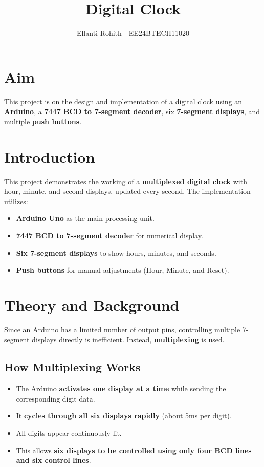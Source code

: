 \documentclass[a4paper,12pt]{article}
\title{\textbf{Digital Clock}}
\author{Ellanti Rohith - EE24BTECH11020}
\theoremstyle{remark}
\begin{document}
\date{}

\maketitle

\section*{Aim}
This project is on the design and implementation of a digital clock using an \textbf{Arduino}, a \textbf{7447 BCD to 7-segment decoder}, six \textbf{7-segment displays}, and multiple \textbf{push buttons}. 

\section{Introduction}
 This project demonstrates the working of a \textbf{multiplexed digital clock} with hour, minute, and second displays, updated every second. The implementation utilizes:
\begin{itemize}
    \item \textbf{Arduino Uno} as the main processing unit.
    \item \textbf{7447 BCD to 7-segment decoder} for numerical display.
    \item \textbf{Six 7-segment displays} to show hours, minutes, and seconds.
    \item \textbf{Push buttons} for manual adjustments (Hour, Minute, and Reset).
\end{itemize}

\section{Theory and Background}
Since an Arduino has a limited number of output pins, controlling multiple 7-segment displays directly is inefficient. Instead, \textbf{multiplexing} is used.

\subsection{How Multiplexing Works}
\begin{itemize}
    \item The Arduino \textbf{activates one display at a time} while sending the corresponding digit data.
    \item It \textbf{cycles through all six displays rapidly} (about 5ms per digit).
    \item All digits appear continuously lit.
    \item This allows \textbf{six displays to be controlled using only four BCD lines and six control lines}.
\end{itemize}
\end{document}
